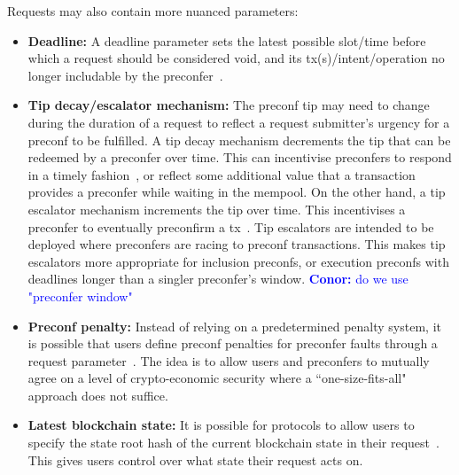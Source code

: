 \documentclass[a4paper]{article}
\theoremstyle{boldstyle}
\newcommand{\cm}[1]{\textcolor{blue}{\textbf{Conor:} #1}}
\begin{document}
    Requests may also contain more nuanced parameters:
    \begin{itemize}
        \item \textbf{Deadline:} A deadline parameter sets the latest possible slot/time before which a request should be considered void, and its tx(s)/intent/operation no longer includable by the preconfer~\cite{W:PreconfirmationsforVanillaBasedRollups}. 
        
        \item \textbf{Tip decay/escalator mechanism:} 
        The preconf tip may need to change during the duration of a request to reflect a request submitter's urgency for a preconf to be fulfilled. A tip decay mechanism decrements the tip that can be redeemed by a preconfer over time. This can incentivise preconfers to respond in a timely fashion~\cite{W:Documentation-BidDecayMechanism}, or reflect some additional value that a transaction provides a preconfer while waiting in the mempool. On the other hand, a tip escalator mechanism increments the tip over time. This incentivises a preconfer to eventually preconfirm a tx~\cite{W:OrderflowauctionsandcentralisationII:orderflowauctions}. Tip escalators are intended to be deployed where preconfers are racing to preconf transactions. This makes tip escalators more appropriate for inclusion preconfs, or execution preconfs with deadlines longer than a singler preconfer's window. \cm{do we use "preconfer window"}
        
        \item \textbf{Preconf penalty:} Instead of relying on a predetermined penalty system, it is possible that users define preconf penalties for preconfer faults through a request parameter~\cite{W:User-DefinedPenalties:EnsuringHonestPreconfBehavior, W:Documentation-BidStructure}. The idea is to allow users and preconfers to mutually agree on a level of crypto-economic security where a ``one-size-fits-all" approach does not suffice.
        
        \item \textbf{Latest blockchain state:} 
        It is possible for protocols to allow users to specify the state root hash of the current blockchain state in their request~\cite{W:AnalyzingBFTProposer-PromisedPreconfirmations}. This gives users control over what state their request acts on.
        

\end{itemize}
\end{document}
